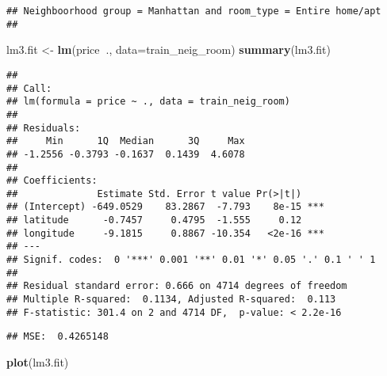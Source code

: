 \documentclass[
]{article}
\newenvironment{Shaded}{\begin{snugshade}}{\end{snugshade}}
\newcommand{\DataTypeTok}[1]{\textcolor[rgb]{0.13,0.29,0.53}{#1}}
\newcommand{\DecValTok}[1]{\textcolor[rgb]{0.00,0.00,0.81}{#1}}
\newcommand{\KeywordTok}[1]{\textcolor[rgb]{0.13,0.29,0.53}{\textbf{#1}}}
\newcommand{\NormalTok}[1]{#1}
\newcommand{\OperatorTok}[1]{\textcolor[rgb]{0.81,0.36,0.00}{\textbf{#1}}}
\newcommand{\StringTok}[1]{\textcolor[rgb]{0.31,0.60,0.02}{#1}}
\begin{document}
\begin{verbatim}
## Neighboorhood group = Manhattan and room_type = Entire home/apt
## 
\end{verbatim}

\begin{Shaded}
\begin{Highlighting}[]
\NormalTok{lm3.fit <-}\StringTok{ }\KeywordTok{lm}\NormalTok{(price}\OperatorTok{~}\NormalTok{., }\DataTypeTok{data=}\NormalTok{train_neig_room)}
\KeywordTok{summary}\NormalTok{(lm3.fit)}
\end{Highlighting}
\end{Shaded}

\begin{verbatim}
## 
## Call:
## lm(formula = price ~ ., data = train_neig_room)
## 
## Residuals:
##     Min      1Q  Median      3Q     Max 
## -1.2556 -0.3793 -0.1637  0.1439  4.6078 
## 
## Coefficients:
##              Estimate Std. Error t value Pr(>|t|)    
## (Intercept) -649.0529    83.2867  -7.793    8e-15 ***
## latitude      -0.7457     0.4795  -1.555     0.12    
## longitude     -9.1815     0.8867 -10.354   <2e-16 ***
## ---
## Signif. codes:  0 '***' 0.001 '**' 0.01 '*' 0.05 '.' 0.1 ' ' 1
## 
## Residual standard error: 0.666 on 4714 degrees of freedom
## Multiple R-squared:  0.1134, Adjusted R-squared:  0.113 
## F-statistic: 301.4 on 2 and 4714 DF,  p-value: < 2.2e-16
\end{verbatim}

\begin{Shaded}
\end{Shaded}

\begin{verbatim}
## MSE:  0.4265148
\end{verbatim}

\begin{Shaded}
\begin{Highlighting}[]
\KeywordTok{plot}\NormalTok{(lm3.fit)}
\end{Highlighting}
\end{Shaded}
\end{document}
